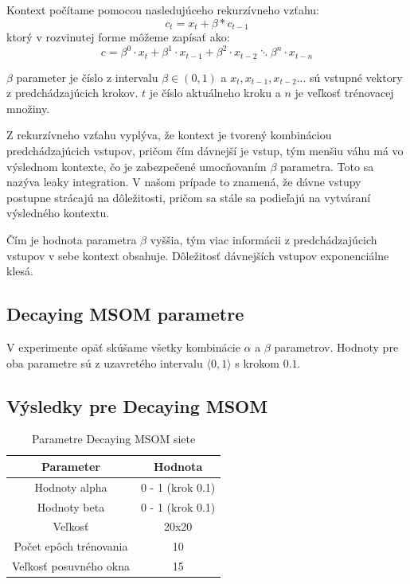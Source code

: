 Kontext počítame pomocou nasledujúceho rekurzívneho vzťahu:
\begin{equation}
    c_{t} = x_{t} + \beta * c_{t-1}
\end{equation}
ktorý v rozvinutej forme môžeme zapísať ako:
\begin{equation}
	c = \beta^{0} \cdot x_{t} + \beta^{1} \cdot x_{t-1} + 
	\beta^{2} \cdot x_{t-2} \ddots \beta^{n} \cdot x_{t-n}
\end{equation}

$\beta$ parameter je číslo z intervalu $\beta \in (0, 1)$ a
$x_t, x_{t-1}, x_{t-2} ...$ sú vstupné vektory z predchádzajúcich krokov.
$t$ je číslo aktuálneho kroku a $n$ je veľkosť trénovacej množiny.

Z rekurzívneho vzťahu vyplýva, že kontext je tvorený kombináciou predchádzajúcich vstupov,
pričom čím dávnejší je vstup, tým menšiu váhu má vo výslednom kontexte, čo je zabezpečené umocňovaním
$\beta$ parametra. Toto sa nazýva leaky integration. V našom prípade
to znamená, že dávne vstupy postupne strácajú na dôležitosti, pričom sa stále sa podieľajú 
na vytváraní výsledného kontextu.

Čím je hodnota parametra $\beta$ vyššia, tým viac informácii z predchádzajúcich vstupov v sebe
kontext obsahuje. Dôležitosť dávnejších vstupov exponenciálne klesá.

\subsection{Decaying MSOM parametre}
V experimente opäť skúšame všetky kombinácie $\alpha$ a $\beta$ parametrov.
Hodnoty pre oba parametre sú z uzavretého intervalu $\langle0, 1\rangle$ s krokom $0.1$.

\subsection{Výsledky pre Decaying MSOM}
\begin{table}[h!]
    \centering
    \begin{tabular}{|c|c|} 
     \hline
     Parameter & Hodnota \\ 
     \hline\hline
     Hodnoty alpha & 0 - 1 (krok 0.1)  \\ 
     \hline
     Hodnoty beta & 0 - 1  (krok 0.1) \\ 
     \hline
     Veľkosť & 20x20  \\
     \hline
     Počet epôch trénovania & 10  \\
     \hline
     Veľkosť posuvného okna & 15 \\
     \hline
    \end{tabular}
    \caption{Parametre Decaying MSOM siete}
    \label{table:1}
    \end{table}
    
